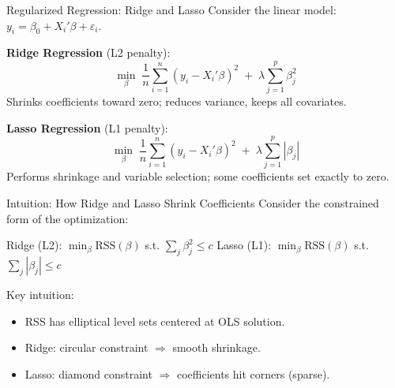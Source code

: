 \documentclass[aspectratio=169]{beamer}
\newcommand{\1}{\mathbf{1}}
\begin{document}
\begin{frame}{Regularized Regression: Ridge and Lasso}
    \small
    Consider the linear model: $y_i = \beta_0 + X_i'\beta + \varepsilon_i$.

    \vspace{0.4em}
    \textbf{Ridge Regression} (L2 penalty):
    \vspace{-0.3em}
    \[
    \min_{\beta} \;
    \frac{1}{n} \sum_{i=1}^n (y_i - X_i'\beta)^2
    \;+\;
    \lambda \sum_{j=1}^p \beta_j^2
    \]
    \vspace{-0.5em}
    Shrinks coefficients toward zero; reduces variance, keeps all covariates.

    \vspace{0.3em}
    \textbf{Lasso Regression} (L1 penalty):
    \vspace{-0.3em}
    \[
    \min_{\beta} \;
    \frac{1}{n} \sum_{i=1}^n (y_i - X_i'\beta)^2
    \;+\;
    \lambda \sum_{j=1}^p |\beta_j|
    \]
    \vspace{-0.5em}
    Performs shrinkage and variable selection; some coefficients set exactly to zero.
\end{frame}


\begin{frame}{Intuition: How Ridge and Lasso Shrink Coefficients}
    \small
    Consider the constrained form of the optimization:

    \vspace{0.3em}
    Ridge (L2): $\min_{\beta} \text{RSS}(\beta)$ s.t. $\sum_{j} \beta_j^2 \leq c$
    \quad
    Lasso (L1): $\min_{\beta} \text{RSS}(\beta)$ s.t. $\sum_{j} |\beta_j| \leq c$

    \vspace{0.4em}
    Key intuition:
    \begin{itemize}
        \setlength\itemsep{0.2em}
        \item RSS has elliptical level sets centered at OLS solution.
        \item Ridge: circular constraint $\Rightarrow$ smooth shrinkage.
        \item Lasso: diamond constraint $\Rightarrow$ coefficients hit corners (sparse).
    \end{itemize}
\end{frame}
\end{document}
